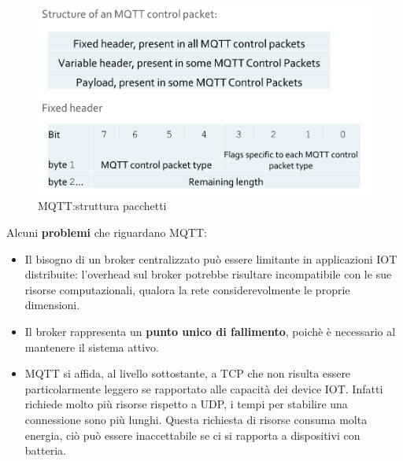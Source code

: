 \documentclass[12pt]{article}
\begin{document}
    		\begin{figure}[h!]
    			\centering
    			\includegraphics[scale=0.3]{img/packet.png}
    			\caption{MQTT:struttura pacchetti}
    		\end{figure}
    		Alcuni\textbf{ problemi} che riguardano MQTT:
    		\begin{itemize}
    			\item Il bisogno di un broker centralizzato può essere limitante in applicazioni IOT distribuite: l'overhead sul broker potrebbe risultare incompatibile con le sue risorse computazionali, qualora la rete considerevolmente le proprie dimensioni.
    			\item Il broker rappresenta un \textbf{punto unico di fallimento}, poichè è necessario al mantenere il sistema attivo. 
    			\item MQTT si affida, al livello sottostante, a TCP che non risulta essere particolarmente leggero se rapportato alle capacità dei device IOT. Infatti richiede molto più risorse rispetto a UDP, i tempi per stabilire una connessione sono più lunghi. Questa richiesta di risorse consuma molta energia, ciò può essere inaccettabile se ci si rapporta a dispositivi con batteria.    
    		\end{itemize}
\end{document}
